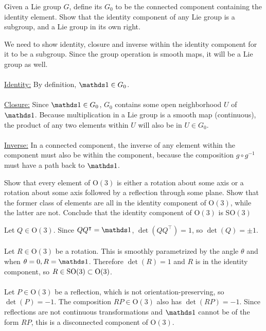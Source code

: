 \documentclass[10pt]{article}
\begin{document}
\begin{example}
	Given a Lie group $G$, define its  $G_0$ to be the connected component containing the identity element. Show that the identity component of any Lie group is a subgroup, and a Lie group in its own right.
\end{example}
\sol We need to show identity, closure and inverse within the identity component for it to be a subgroup. Since the group operation is smooth maps, it will be a Lie group as well.\\\\
\underline{Identity:}
By definition, $\id \in G_0$.\\\\
\underline{Closure:}
Since $\id \in G_0$, $G_0$ contains some open neighborhood $U$ of $\id$. Because multiplication in a Lie group is a smooth map (continuous), the product of any two elements within $U$ will also be in $U \in G_0$.\\\\
\underline{Inverse:}
In a connected component, the inverse of any element within the component must also be within the component, because the composition $g \circ g^{-1}$ must have a path back to $\id$.


\begin{example}
	Show that every element of O$(3)$ is either a rotation about some axis or a rotation about some axis followed by a reflection through some plane. Show that the former class of elements are all in the identity component of O$(3)$, while the latter are not. Conclude that the identity component of O$(3)$ is SO$(3)$
\end{example}
\sol Let $Q\in \text{O}(3)$. Since $QQ^\intercal = \id$, $\det (QQ^\intercal) = 1$, so $\det (Q) = \pm 1$.\\\\
Let $R \in \text{O}(3)$ be a rotation. This is smoothly parametrized by the angle $\theta$ and when $\theta = 0,R=\id$. Therefore $\det (R) = 1$ and $R$ is in the identity component, so $R \in \text{SO}(3) \subset \text{O}(3)$.\\\\
Let $P \in \text{O}(3)$ be a reflection, which is not orientation-preserving, so $\det (P) = -1$. The composition $RP \in \text{O}(3)$ also has $\det (RP) = -1$. Since reflections are not continuous transformations and $\id$ cannot be of the form $RP$, this is a disconnected component of O$(3)$.
\end{document}
